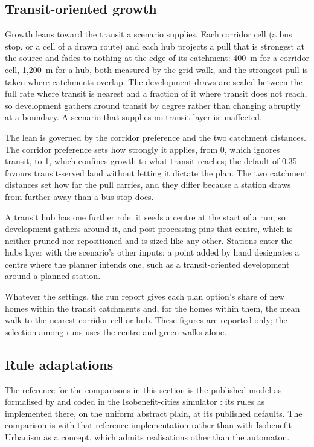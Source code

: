 \documentclass[11pt]{article}
\begin{document}
\subsection{Transit-oriented growth}
\label{sec:transit}

Growth leans toward the transit a scenario supplies. Each corridor
cell (a bus stop, or a cell of a drawn route) and each hub projects a
pull that is strongest at the source and fades to nothing at the edge
of its catchment: 400~m for a corridor cell, 1{,}200~m for a hub,
both measured by the grid walk, and the strongest pull is taken where
catchments overlap. The
development draws are scaled between the full rate where transit is
nearest and a fraction of it where transit does not reach, so
development gathers around transit by degree rather than changing
abruptly at a boundary. A scenario that supplies no transit layer is
unaffected.

The lean is governed by the corridor preference and the two catchment distances. The corridor preference sets how strongly
it applies, from 0, which ignores transit, to 1, which confines growth
to what transit reaches; the default of 0.35 favours transit-served land
without letting it dictate the plan. The two catchment distances set how
far the pull carries, and they differ because a station draws from
further away than a bus stop does.

A transit hub has one further role: it seeds a centre at the start of a
run, so development gathers around it, and post-processing pins that
centre, which is neither pruned nor repositioned and is sized like any
other. Stations enter the hubs layer with the scenario's other inputs; a
point added by hand designates a centre where the planner intends one,
such as a transit-oriented development around a planned station.

Whatever the settings, the run report gives each plan option's share of new homes within the transit catchments and, for the homes within them, the mean walk to the nearest corridor cell or hub. These figures are reported only; the selection among runs uses the centre and green walks alone.

\subsection{Rule adaptations}
\label{sec:rules}

The reference for the comparisons in this section is the published
model as formalised by \citet{dacci2019} and coded in the
Isobenefit-cities simulator \citep{dacci_voto2023, voto_code}: its
rules as implemented there, on the uniform abstract plain, at its
published defaults. The comparison is with that reference
implementation rather than with Isobenefit Urbanism as a concept,
which admits realisations other than the automaton.
\end{document}
